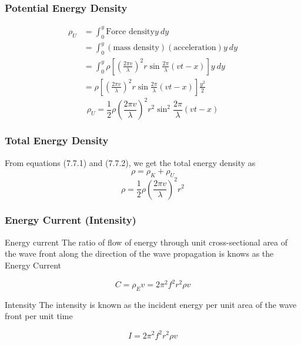\documentclass[12pt]{article}
\numberwithin{equation}{subsection}
\begin{document}
\subsubsection{Potential Energy Density}
\begin{align*}
    \rho_U &= \int_{0}^{y} {\text{Force density} y} \: d{y} \\
    &= \int_{0}^{y} {(\text{mass density})(\text{acceleration}) y} \: d{y} \\
    &= \int_{0}^{y} {\rho \left[ \left(\frac{2\pi v}{\lambda}\right)^2 r \sin{\frac{2\pi}{\lambda}(vt-x)} \right] y} \: d{y}  \\
    &= \rho \left[ \left(\frac{2\pi v}{\lambda}\right)^2 r \sin{\frac{2\pi}{\lambda}(vt-x)} \right] \frac{y^2}{2}
\end{align*}
\begin{equation}
    \boxed{ \rho_U = \frac{1}{2} \rho \left( \frac{2\pi v}{\lambda} \right)^2 r^2 \sin^2{\frac{2\pi}{\lambda} (vt - x)} }
\end{equation}

\subsubsection{Total Energy Density}
From equations (7.7.1) and (7.7.2), we get the total energy density as \[
    \rho = \rho_K + \rho_U
\]
\begin{equation}
    \boxed{ \rho = \frac{1}{2} \rho \left( \frac{2\pi v}{\lambda} \right)^2 r^2 }
\end{equation}

\subsubsection{Energy Current (Intensity)}
\begin{definition}{Energy current}{}
    The ratio of flow of energy through unit cross-sectional area of the wave front along the direction of the wave propagation is knows as the Energy Current

    \begin{equation}
        \boxed{ C = \rho_E v = 2\pi^2f^2r^2\rho v }
    \end{equation}
\end{definition}

\begin{definition}{Intensity}{}
    The intensity is known as the incident energy per unit area of the wave front per unit time

    \begin{equation}
        \boxed{ I = 2\pi^2f^2r^2\rho v }
    \end{equation}
\end{definition}
\end{document}
